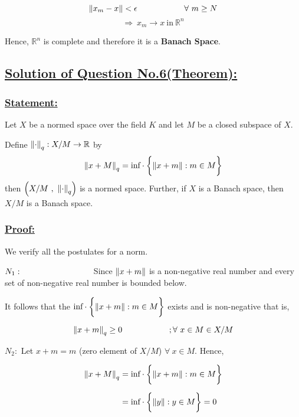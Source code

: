 \documentclass[a4paper,12pt]{article}
\begin{document}
    \[\norm{x_m -x} < \epsilon \hspace*{2cm} \forall\ m\geq N\]
    \[\Rightarrow\ x_m\to x\ \mbox{in}\ \mathbb{R}^n\]

    Hence, $\mathbb{R}^n$ is complete and therefore it is a {\bf Banach Space}.

    \pagebreak

    \subsection*{\underline{Solution of Question No.6(Theorem):}}

    \subsubsection*{\underline{{\bf Statement:}}}

    Let $X$ be a normed space over the field $K$ and let $M$ be a closed subspace of $X$.
        
    Define $\norm{\cdot}_q : X/M \to \mathbb{R}$ by 
    \[\norm{x+M}_q = \mbox{inf}\cdot \biggl\{\norm{x + m} : m\in M\biggr\}\]
    then $\left(X/M\  ,\ \norm{\cdot}_q \right)$ is a normed space. Further, if $X$ is a Banach space, then $X/M$ is a Banach space.   

    \subsubsection*{\underline{{\bf Proof:}}}

    We verify all the postulates for a norm.

    $N_1: \hspace*{3cm}$ Since $\norm{x + m}$ is a non-negative real number and every set of non-negative real number is bounded below.

    It follows that the $\mbox{inf}\cdot \biggl\{\norm{x + m} : m\in M\biggr\}$ exists and is non-negative that is,

    \[\norm{x + m}_q \geq 0 \hspace*{2cm} ; \forall\ x\in M\in X/M\]

    $N_2:$ Let $x+m = m$ (zero element of $X/M$) $\forall\ x\in M$. Hence,

    \begin{equation*}
        \begin{split}
            \norm{x+M}_q & = \mbox{inf}\cdot \biggl\{\norm{x + m} : m\in M\biggr\}\\[2mm]
            & = \mbox{inf}\cdot \biggl\{\norm{y} : y\in M\biggr\} = 0\\[2mm]
        \end{split}
    \end{equation*}
\end{document}
